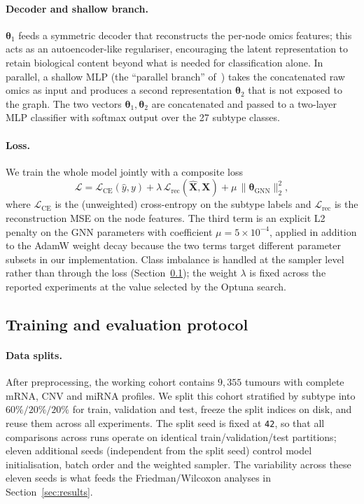 \documentclass[review,3p,times,11pt, ]{elsarticle} %
\begin{document}
\paragraph{Decoder and shallow branch.}
$\boldsymbol{\theta}_1$ feeds a symmetric decoder that reconstructs the
per-node omics features; this acts as an autoencoder-like
regulariser, encouraging the latent representation to retain biological
content beyond what is needed for classification alone. In parallel, a
shallow MLP (the ``parallel branch'' of~\cite{li_multimodal_2024})
takes the concatenated raw omics as input and produces a second
representation $\boldsymbol{\theta}_2$ that is not exposed to the
graph. The two vectors $\boldsymbol{\theta}_1, \boldsymbol{\theta}_2$
are concatenated and passed to a two-layer MLP classifier with
softmax output over the 27 subtype classes.

\paragraph{Loss.}
We train the whole model jointly with a composite loss
%
\begin{equation}
    \mathcal{L} = \mathcal{L}_{\text{CE}}(\hat{y}, y)
                + \lambda \, \mathcal{L}_{\text{rec}}(\hat{\mathbf{X}}, \mathbf{X})
                + \mu \, \|\boldsymbol{\theta}_{\text{GNN}}\|_2^2,
\end{equation}
%
where $\mathcal{L}_{\text{CE}}$ is the (unweighted) cross-entropy on
the subtype labels and $\mathcal{L}_{\text{rec}}$ is the reconstruction
MSE on the node features. The third term is an explicit L2 penalty on
the GNN parameters with coefficient $\mu = 5 \times 10^{-4}$, applied
in addition to the AdamW weight decay because the two terms target
different parameter subsets in our implementation. Class imbalance is
handled at the sampler level rather than through the loss
(Section~\ref{ssec:training}); the weight $\lambda$ is fixed across
the reported experiments at the value selected by the Optuna search.

\subsection{Training and evaluation protocol}
\label{ssec:training}

\paragraph{Data splits.}
After preprocessing, the working cohort contains $9{,}355$ tumours
with complete mRNA, CNV and miRNA profiles. We split this cohort
stratified by subtype into $60\%/20\%/20\%$ for train, validation and
test, freeze the split indices on disk, and reuse them across all
experiments. The split seed is fixed at \texttt{42}, so that all
comparisons across runs operate on identical train/validation/test
partitions; eleven additional seeds (independent from the split seed)
control model initialisation, batch order and the weighted sampler.
The variability across these eleven seeds is what feeds the
Friedman/Wilcoxon analyses in Section~\ref{sec:results}.
\end{document}
